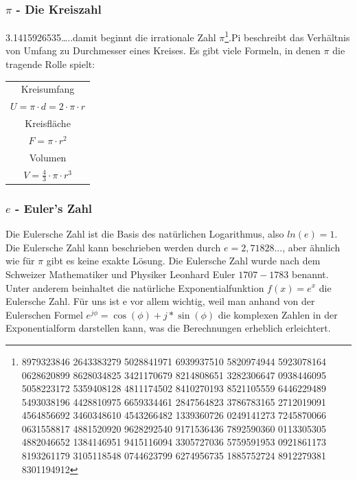\documentclass[letterpaper, titlepage]{article}
\begin{document}
\subsubsection{$\pi$ - Die Kreiszahl}\label{Die Kreiszahl}
3.1415926535\dots ..damit beginnt die irrationale Zahl $\pi$\footnote{8979323846 2643383279 5028841971 6939937510 5820974944 5923078164 0628620899 8628034825 3421170679 8214808651 3282306647 0938446095 5058223172 5359408128 4811174502 8410270193 8521105559 6446229489 5493038196 4428810975 6659334461 2847564823 3786783165 2712019091 4564856692 3460348610 4543266482 1339360726 0249141273 7245870066 0631558817 4881520920 9628292540 9171536436 7892590360 0113305305 4882046652 1384146951 9415116094 3305727036 5759591953 0921861173 8193261179 3105118548 0744623799 6274956735 1885752724 8912279381 8301194912}.Pi beschreibt das Verhältnis von Umfang zu Durchmesser eines Kreises. Es gibt viele Formeln, in denen $\pi$ die tragende Rolle spielt:


\begin{center}
\renewcommand{\arraystretch}{1.5} %
\begin{tabular}{|c|}
\hline
Kreisumfang \\
\(U = \pi \cdot d = 2 \cdot \pi \cdot r\) \\
\hline
Kreisfläche \\
\(F = \pi \cdot r^2\) \\
\hline
Volumen \\
\(V = \frac{4}{3} \cdot \pi \cdot r^3\) \\
\hline
\end{tabular}
\renewcommand{\arraystretch}{1.0} %
\end{center}
\hfill

\subsubsection{$e$ - Euler's Zahl}\label{Euler's Zahl}
Die Eulersche Zahl ist die Basis des natürlichen Logarithmus, also $ln(e) = 1$. Die Eulersche Zahl kann beschrieben werden durch $e = 2,71828$..., aber ähnlich wie für $\pi$ gibt es keine exakte Lösung. Die Eulersche Zahl wurde nach dem Schweizer Mathematiker und Physiker Leonhard Euler \(1707-1783\) benannt. Unter anderem beinhaltet die natürliche Exponentialfunktion $f(x) = e^x$ die Eulersche Zahl. Für uns ist e vor allem wichtig, weil man anhand von der Eulerschen Formel $e^{j\phi}=\cos(\phi)+j*\sin(\phi)$ die komplexen Zahlen in der Exponentialform darstellen kann, was die Berechnungen erheblich erleichtert.
\end{document}
